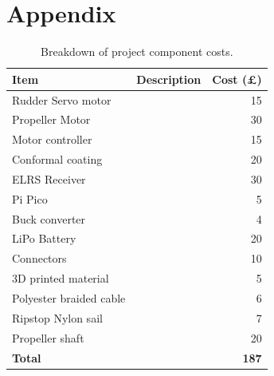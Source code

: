\documentclass{article}
\begin{document}
\section{Appendix}

\begin{table}[h!]
\centering
\begin{tabular}{l l r}
\hline
\textbf{Item} & \textbf{Description} & \textbf{Cost (£)} \\
\hline
Rudder Servo motor         &  & 15 \\
Propeller Motor            &  & 30 \\
Motor controller           &  & 15 \\
Conformal coating          &  & 20 \\
ELRS Receiver              &  & 30 \\
Pi Pico                    &  & 5  \\
Buck converter             &  & 4  \\
LiPo Battery               &  & 20 \\
Connectors                 &  & 10 \\
3D printed material        &  & 5  \\
Polyester braided cable    &  & 6  \\
Ripstop Nylon sail         &  & 7  \\
Propeller shaft            &  & 20 \\
\hline
\textbf{Total} &  & \textbf{187} \\
\hline
\end{tabular}
\caption{Breakdown of project component costs.}
\label{tab:component_costs}
\end{table}

\end{document}
